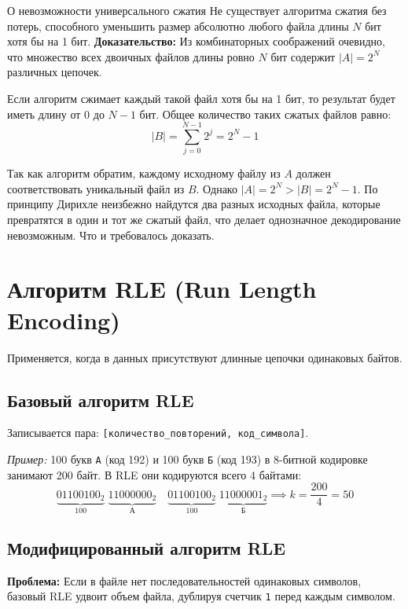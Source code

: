 \documentclass[11pt,a4paper]{article}
\begin{document}
\begin{theorembox}{О невозможности универсального сжатия}
Не существует алгоритма сжатия без потерь, способного уменьшить размер абсолютно любого файла длины $N$ бит хотя бы на 1 бит.
\tcblower
\textbf{Доказательство:}  
Из комбинаторных соображений очевидно, что множество всех двоичных файлов длины ровно $N$ бит содержит $|A| = 2^N$ различных цепочек.

Если алгоритм сжимает каждый такой файл хотя бы на 1 бит, то результат будет иметь длину от $0$ до $N-1$ бит. Общее количество таких сжатых файлов равно:
$$|B| = \sum_{j=0}^{N-1} 2^j = 2^N - 1$$

Так как алгоритм обратим, каждому исходному файлу из $A$ должен соответствовать уникальный файл из $B$. Однако $|A| = 2^N > |B| = 2^N - 1$. По принципу Дирихле неизбежно найдутся два разных исходных файла, которые превратятся в один и тот же сжатый файл, что делает однозначное декодирование невозможным. Что и требовалось доказать.
\end{theorembox}

\section{Алгоритм RLE (Run Length Encoding)}

Применяется, когда в данных присутствуют длинные цепочки одинаковых байтов.

\subsection{Базовый алгоритм RLE}

Записывается пара: \texttt{[количество\_повторений, код\_символа]}.  

\textit{Пример:} 100 букв \texttt{А} (код 192) и 100 букв \texttt{Б} (код 193) в 8-битной кодировке занимают 200 байт. В RLE они кодируются всего 4 байтами:
$$\underbrace{01100100_2}_{100} \; \underbrace{11000000_2}_{\text{А}} \quad \underbrace{01100100_2}_{100} \; \underbrace{11000001_2}_{\text{Б}} \implies k = \frac{200}{4} = 50$$

\subsection{Модифицированный алгоритм RLE}

\textbf{Проблема:} Если в файле нет последовательностей одинаковых символов, базовый RLE удвоит объем файла, дублируя счетчик \texttt{1} перед каждым символом.  
\end{document}
